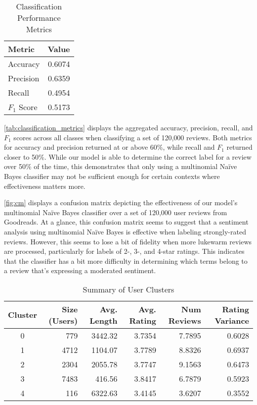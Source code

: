 \begin{table}[h]
	\renewcommand{\arraystretch}{1.3}
	\caption{Classification Performance Metrics}
	\label{tab:classification_metrics}
	\centering
	\begin{tabular}{l r}
		\hline
		\textbf{Metric} & \textbf{Value} \\
		\hline
		Accuracy  & 0.6074 \\
		Precision & 0.6359 \\
		Recall    & 0.4954 \\
		\(F_1\) Score  & 0.5173 \\
		\hline
	\end{tabular}
\end{table}

\autoref{tab:classification_metrics} displays the aggregated accuracy, precision, recall, and \(F_1\) scores across all classes when classifying a set of 120,000 reviews.
Both metrics for accuracy and precision returned at or above 60\%, while recall and \(F_1\) returned closer to 50\%.
While our model is able to determine the correct label for a review over 50\% of the time,
this demonstrates that only using a multinomial Na\"ive Bayes classifier may not be sufficient enough for certain contexts where
effectiveness matters more.

\autoref{fig:cm} displays a confusion matrix depicting the effectiveness of our model's multinomial Na\"ive Bayes classifier over a set of 120,000 user reviews from Goodreads.
At a glance, this confusion matrix seems to suggest that a sentiment analysis using multinomial Na\"ive Bayes is effective when labeling strongly-rated reviews.
However, this seems to lose a bit of fidelity when more lukewarm reviews are processed, particularly for labels of 2-, 3-, and 4-star ratings. This indicates that the classifier has a bit more difficulty in determining which terms belong to a review that's expressing a moderated sentiment.

\begin{table*}[!t]
	\renewcommand{\arraystretch}{1.3}
	\caption{Summary of User Clusters}
	\label{tab:user_clusters}
	\centering
	\begin{tabular}{c r r r r r}
		\hline
		\textbf{Cluster} & \textbf{Size (Users)} & \textbf{Avg. Length} & \textbf{Avg. Rating} & \textbf{Num Reviews} & \textbf{Rating Variance} \\
		\hline
		0 & 779  & 3442.32 & 3.7354 & 7.7895 & 0.6028 \\
		1 & 4712 & 1104.07 & 3.7789 & 8.8326 & 0.6937 \\
		2 & 2304 & 2055.78 & 3.7747 & 9.1563 & 0.6473 \\
		3 & 7483 &  416.56 & 3.8417 & 6.7879 & 0.5923 \\
		4 & 116  & 6322.63 & 3.4145 & 3.6207 & 0.3552 \\
		\hline
	\end{tabular}
\end{table*}

